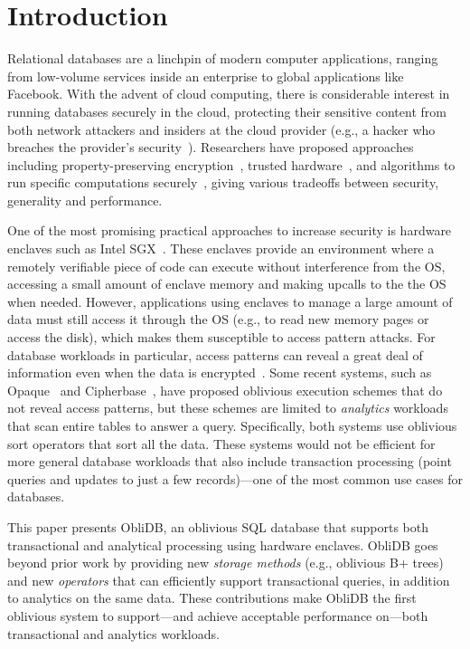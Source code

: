 \documentclass[letterpaper,twocolumn,10pt]{article}
\def\name/{ObliDB}
\begin{document}
\section{Introduction}

Relational databases are a linchpin of modern computer applications, ranging from low-volume services inside an enterprise to global applications like Facebook.
With the advent of cloud computing, there is considerable interest in running databases securely in the cloud, protecting their sensitive content from both network attackers and insiders at the cloud provider (e.g., a hacker who breaches the provider's security~\cite{yahoo-hack}).
Researchers have proposed approaches including property-preserving encryption~\cite{PRZB12,mylar,FVY+17}, trusted hardware~\cite{cipherbase,ZDB+17}, and algorithms to run specific computations securely~\cite{WZPM16,NWI+13,WYG+17}, giving various tradeoffs between security, generality and performance.

One of the most promising practical approaches to increase security is hardware enclaves such as Intel SGX~\cite{CD16}.
These enclaves provide an environment where a remotely verifiable piece of code can execute without interference from the OS, accessing a small amount of enclave memory and making upcalls to the the OS when needed.
However, applications using enclaves to manage a large amount of data must still access it through the OS (e.g., to read new memory pages or access the disk), which makes them susceptible to access pattern attacks.
For database workloads in particular, access patterns can reveal a great deal of information even when the data is encrypted~\cite{IKK12,XCP15,mr-leakage}. %
Some recent systems, such as Opaque~\cite{ZDB+17} and Cipherbase~\cite{cipherbase}, have proposed oblivious execution schemes that do not reveal access patterns, but these schemes are limited to \emph{analytics} workloads that scan entire tables to answer a query.
Specifically, both systems use oblivious sort operators that sort all the data.
These systems would not be efficient for more general database workloads that also include transaction processing (point queries and updates to just a few records)---one of the most common use cases for databases.

This paper presents \name/, an oblivious SQL database that supports both transactional and analytical processing using hardware enclaves.
\name/ goes beyond prior work by providing new \emph{storage methods} (e.g., oblivious B+ trees) and new \emph{operators} that can efficiently support transactional queries, in addition to analytics on the same data.
These contributions make \name/ the first oblivious system to support---and achieve acceptable performance on---both transactional and analytics workloads.
\end{document}
